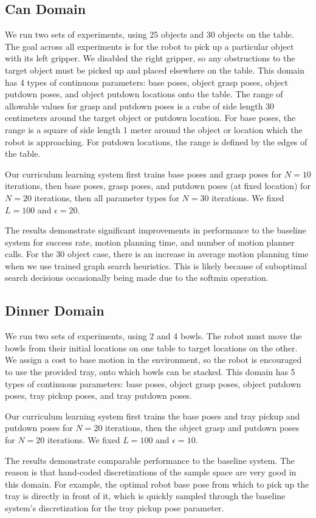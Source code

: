 \subsection{Can Domain}
We run two sets of experiments, using 25 objects and 30 objects on the table.
The goal across all experiments is for the robot to pick up a particular object with its
left gripper. We disabled the right gripper, so any obstructions to the target object must be picked up and
placed elsewhere on the table. This domain has 4 types of continuous parameters: base poses, object grasp
poses, object putdown poses, and object putdown locations onto the table. The range of allowable values for
grasp and putdown poses is a cube of side length 30 centimeters around the target object or putdown
location. For base poses, the range is a square of side length 1 meter around the object or location which
the robot is approaching. For putdown locations, the range is defined by the edges of the table.

Our curriculum learning system first trains base poses and grasp poses for $N = 10$ iterations,
then base poses, grasp poses, and putdown poses (at fixed location) for $N = 20$ iterations, then all parameter types for $N = 30$ iterations.
We fixed $L = 100$ and $\epsilon = 20$.

The results demonstrate significant improvements in performance to the baseline system for success rate, motion planning
time, and number of motion planner calls. For the 30 object case,
there is an increase in average motion planning time when we use trained graph search heuristics. This is likely because of suboptimal
search decisions occasionally being made due to the softmin operation.

\subsection{Dinner Domain}
We run two sets of experiments, using 2 and 4 bowls. The robot must move the
bowls from their initial locations on one table to target locations on the other. We assign a cost to
base motion in the environment, so the robot is encouraged to use the provided tray, onto which bowls can be stacked.
This domain has 5 types of continuous parameters: base poses, object grasp poses, object putdown poses, tray pickup
poses, and tray putdown poses.

Our curriculum learning system first trains the base poses and tray pickup and putdown poses for
$N = 20$ iterations, then the object grasp and putdown poses for $N = 20$ iterations. We fixed $L = 100$ and $\epsilon = 10$.

The results demonstrate comparable performance to the baseline system. The reason is that
hand-coded discretizations of the sample space are very good in this domain. For example, the optimal
robot base pose from which to pick up the tray is directly in front of it, which is quickly sampled through
the baseline system's discretization for the tray pickup pose parameter.
